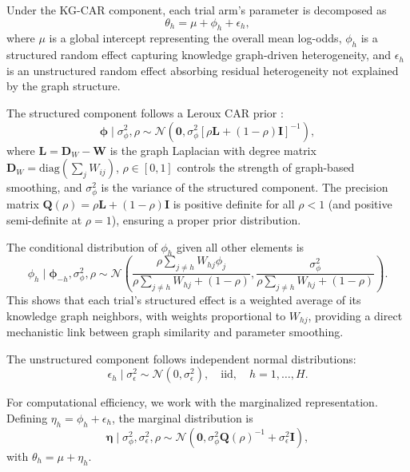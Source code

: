 \documentclass[12pt]{article}
\newcommand{\bphi}{\boldsymbol{\phi}}
\newcommand{\bW}{\mathbf{W}}
\newcommand{\bL}{\mathbf{L}}
\newcommand{\bD}{\mathbf{D}}
\newcommand{\bI}{\mathbf{I}}
\newcommand{\bQ}{\mathbf{Q}}
\begin{document}
Under the KG-CAR component, each trial arm's parameter is decomposed as
\begin{equation}
\label{eq:bym}
\theta_h = \mu + \phi_h + \epsilon_h,
\end{equation}
where $\mu$ is a global intercept representing the overall mean log-odds, $\phi_h$ is a structured random effect capturing knowledge graph-driven heterogeneity, and $\epsilon_h$ is an unstructured random effect absorbing residual heterogeneity not explained by the graph structure.

The structured component follows a Leroux CAR prior \citep{leroux2000estimation}:
\begin{equation}
\label{eq:leroux}
\bphi \mid \sigma_\phi^2, \rho \sim \mathcal{N}\left(\mathbf{0}, \sigma_\phi^2 \left[\rho \bL + (1 - \rho) \bI\right]^{-1}\right),
\end{equation}
where $\bL = \bD_W - \bW$ is the graph Laplacian with degree matrix $\bD_W = \text{diag}(\sum_j W_{ij})$, $\rho \in [0, 1]$ controls the strength of graph-based smoothing, and $\sigma_\phi^2$ is the variance of the structured component. The precision matrix $\bQ(\rho) = \rho \bL + (1 - \rho) \bI$ is positive definite for all $\rho < 1$ (and positive semi-definite at $\rho = 1$), ensuring a proper prior distribution.

The conditional distribution of $\phi_h$ given all other elements is
\begin{equation}
\label{eq:car_conditional}
\phi_h \mid \bphi_{-h}, \sigma_\phi^2, \rho \sim \mathcal{N}\left(\frac{\rho \sum_{j \neq h} W_{hj} \phi_j}{\rho \sum_{j \neq h} W_{hj} + (1 - \rho)}, \frac{\sigma_\phi^2}{\rho \sum_{j \neq h} W_{hj} + (1 - \rho)}\right).
\end{equation}
This shows that each trial's structured effect is a weighted average of its knowledge graph neighbors, with weights proportional to $W_{hj}$, providing a direct mechanistic link between graph similarity and parameter smoothing.

The unstructured component follows independent normal distributions:
\begin{equation}
\label{eq:unstructured}
\epsilon_h \mid \sigma_\epsilon^2 \sim \mathcal{N}(0, \sigma_\epsilon^2), \quad \text{iid}, \quad h = 1, \ldots, H.
\end{equation}

For computational efficiency, we work with the marginalized representation. Defining $\eta_h = \phi_h + \epsilon_h$, the marginal distribution is
\begin{equation}
\label{eq:marginal}
\boldsymbol{\eta} \mid \sigma_\phi^2, \sigma_\epsilon^2, \rho \sim \mathcal{N}\left(\mathbf{0}, \sigma_\phi^2 \bQ(\rho)^{-1} + \sigma_\epsilon^2 \bI\right),
\end{equation}
with $\theta_h = \mu + \eta_h$.
\end{document}
